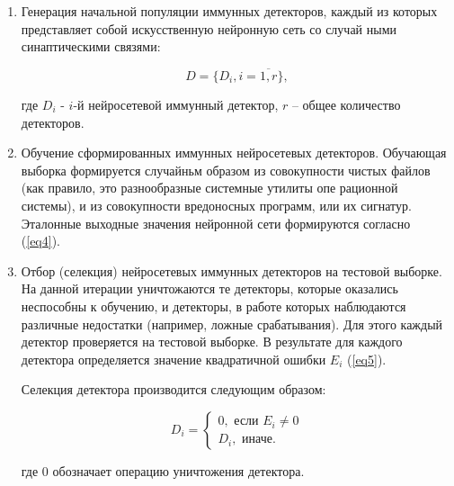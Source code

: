 \documentclass[bachelor, och, referat]{template}
\begin{document}
\begin{enumerate}
    \item Генерация начальной популяции иммунных детекторов, каждый из
    которых представляет собой искусственную нейронную сеть со случай­
    ными синаптическими связями:

    \begin{equation}
        D = \{D_i, i = \overline{1, r}\},
    \end{equation}

    где $D_i$ - $i$-й нейросетевой иммунный детектор, $r$ -- общее количество детекторов.
    \item Обучение сформированных иммунных нейросетевых детекторов.
    Обучающая выборка формируется случайньм образом из совокупности
    чистых файлов (как правило, это разнообразные системные утилиты опе­
    рационной системы), и из совокупности вредоносных программ, или их
    сигнатур. Эталонные выходные значения нейронной сети формируются
    согласно (\ref{eq4}).
    \item Отбор (селекция) нейросетевых иммунных детекторов на тестовой
    выборке. На данной итерации уничтожаются те детекторы, которые 
    ока­зались неспособны к обучению, и детекторы, в работе которых наблюда­ются 
    различные недостатки (например, ложные срабатывания). Для этого
    каждый детектор проверяется на тестовой выборке. В результате для каж­дого 
    детектора определяется значение квадратичной ошибки $E_i$ (\ref{eq5}).

    Селекция детектора производится следующим образом:

    \begin{equation}
        D_i = 
        \begin{cases}
            0, \text{ если } E_i \neq 0 \\
            D_i, \text{ иначе.}
        \end{cases}
        \label{eq7}
    \end{equation}

    где 0 обозначает операцию уничтожения детектора.


\end{enumerate}
\end{document}
